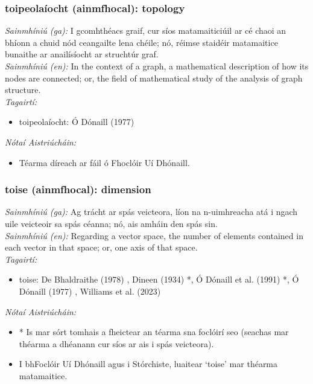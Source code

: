 \subsubsection*{toipeolaíocht (ainmfhocal): topology}
 \noindent \textit{Sainmhíniú (ga):} I gcomhthéacs graif, cur síos matamaiticiúil ar cé chaoi an bhíonn a chuid nód ceangailte lena chéile; nó, réimse staidéir matamaitice bunaithe ar anailísíocht ar struchtúr graf.
\\
 \noindent \textit{Sainmhíniú (en):} In the context of a graph, a mathematical description of how its nodes are connected; or, the field of mathematical study of the analysis of graph structure.
\\
 \noindent \textit{Tagairtí:}
\begin{itemize}
	\item toipeolaíocht: Ó Dónaill (1977) \cite{odonaill}
\end{itemize}

 \noindent \textit{Nótaí Aistriúcháin:}
\begin{itemize}
	\item Téarma díreach ar fáil ó Fhoclóir Uí Dhónaill.
\end{itemize}


\subsubsection*{toise (ainmfhocal): dimension}
 \noindent \textit{Sainmhíniú (ga):} Ag trácht ar spás veicteora, líon na n-uimhreacha atá i ngach uile veicteoir sa spás céanna; nó, ais amháin den spás sin.
\\
 \noindent \textit{Sainmhíniú (en):} Regarding a vector space, the number of elements contained in each vector in that space; or, one axis of that space.
\\
 \noindent \textit{Tagairtí:}
\begin{itemize}
	\item toise: De Bhaldraithe (1978) \cite{de-bhaldraithe}, Dineen (1934) \cite{dineen}*, Ó Dónaill et al. (1991) \cite{focloir-beag}*, Ó Dónaill (1977) \cite{odonaill}, Williams et al. (2023) \cite{storchiste}
\end{itemize}

 \noindent \textit{Nótaí Aistriúcháin:}
\begin{itemize}
	\item * Is mar sórt tomhais a fheictear an téarma sna foclóirí seo (seachas mar théarma a dhéanann cur síos ar ais i spás veicteora).
	\item I bhFoclóir Uí Dhónaill agus i Stórchiste, luaitear `toise' mar théarma matamaitice.
\end{itemize}


